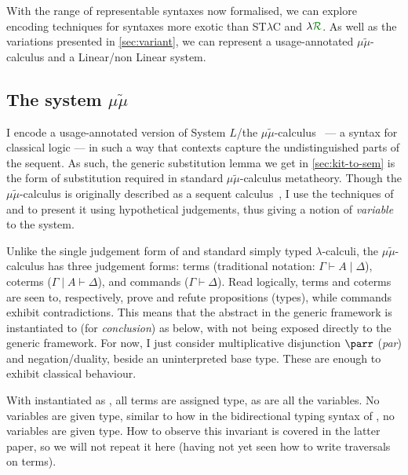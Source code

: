 With the range of representable syntaxes now formalised, we can explore encoding
techniques for syntaxes more exotic than ST$\lambda$C and $\name$.
As well as the variations presented in \cref{sec:variant}, we can represent a
usage-annotated $\mu\tilde\mu$-calculus and a Linear/non Linear system.

\subsection{The system $\mu\tilde\mu$}
I encode a usage-annotated version of System $L$/the
$\mu\tilde\mu$-calculus~\citep{CH00} --- a syntax for classical logic --- in
such a way that contexts capture the undistinguished parts of the sequent.
As such, the generic substitution lemma we get in \cref{sec:kit-to-sem} is the
form of substitution required in standard $\mu\tilde\mu$-calculus metatheory.
Though the $\mu\tilde\mu$-calculus is originally described as a sequent
calculus~\citep{CH00}, I use the techniques of
\citet[p.~12]{herbelin-hab} and \citet{LC06} to present it using hypothetical
judgements, thus giving a notion of \emph{variable} to the system.

Unlike the single judgement form of \name{} and standard simply typed
$\lambda$-calculi, the $\mu\tilde\mu$-calculus has three judgement forms:
terms (traditional notation: $\Gamma \vdash A \mid \Delta$), coterms
($\Gamma \mid A \vdash \Delta$), and commands ($\Gamma \vdash \Delta$).
Read logically, terms and coterms are seen to, respectively, prove and refute
propositions (types), while commands exhibit contradictions.
This means that the abstract  in the generic framework is
instantiated to  (for \emph{conclusion}) as below, with
 not being exposed directly to the generic framework.
For now, I just consider multiplicative disjunction $\parr$ (\emph{par}) and
negation/duality, beside an uninterpreted base type.
These are enough to exhibit classical behaviour.

\noindent
\begin{minipage}[t]{0.5\textwidth}
\end{minipage}
\begin{minipage}[t]{0.5\textwidth}
\end{minipage}

With  instantiated as , all terms are assigned
 type, as are all the variables.
No variables are given  type, similar to how in
the bidirectional typing syntax of \citet[p.~25]{AACMM21}, no variables are
given  type.
How to observe this invariant is covered in the latter paper, so we will not
repeat it here (having not yet seen how to write traversals on terms).

